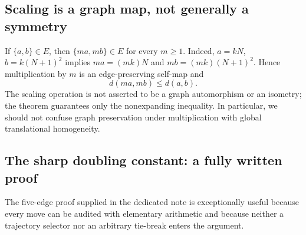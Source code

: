 \documentclass[11pt,a4paper]{article}
\theoremstyle{definition}\newtheorem{definition}[theorem]{Definition}
\begin{document}
\subsection{Scaling is a graph map, not generally a symmetry}
If $\{a,b\}\in E$, then $\{ma,mb\}\in E$ for every $m\ge1$. Indeed, $a=kN$, $b=k(N+1)^2$ implies $ma=(mk)N$ and $mb=(mk)(N+1)^2$. Hence multiplication by $m$ is an edge-preserving self-map and
\begin{equation}\label{eq:scaling}
d(ma,mb)\le d(a,b).
\end{equation}
The scaling operation is not asserted to be a graph automorphism or an isometry; the theorem guarantees only the nonexpanding inequality. In particular, we should not confuse graph preservation under multiplication with global translational homogeneity.

\subsection{The sharp doubling constant: a fully written proof}
\label{subsec:doubling}
The five-edge proof supplied in the dedicated note \cite{doublingnote} is exceptionally useful because every move can be audited with elementary arithmetic and because neither a trajectory selector nor an arbitrary tie-break enters the argument.
\end{document}
